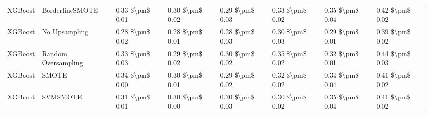 \begin{tabular}{llllllll}
                        XGBoost &               BorderlineSMOTE & 0.33 \$\textbackslash pm\$ 0.01 &           0.30 \$\textbackslash pm\$ 0.02 &       0.29 \$\textbackslash pm\$ 0.03 &        0.33 \$\textbackslash pm\$ 0.02 &                         0.35 \$\textbackslash pm\$ 0.04 &     0.42 \$\textbackslash pm\$ 0.02 \\
                        XGBoost &                 No Upsampling & 0.28 \$\textbackslash pm\$ 0.02 &           0.28 \$\textbackslash pm\$ 0.01 &       0.28 \$\textbackslash pm\$ 0.03 &        0.30 \$\textbackslash pm\$ 0.03 &                         0.29 \$\textbackslash pm\$ 0.01 &     0.39 \$\textbackslash pm\$ 0.02 \\
                        XGBoost &           Random Oversampling & 0.33 \$\textbackslash pm\$ 0.03 &           0.29 \$\textbackslash pm\$ 0.02 &       0.30 \$\textbackslash pm\$ 0.02 &        0.35 \$\textbackslash pm\$ 0.02 &                         0.32 \$\textbackslash pm\$ 0.01 &     0.44 \$\textbackslash pm\$ 0.03 \\
                        XGBoost &                         SMOTE & 0.34 \$\textbackslash pm\$ 0.00 &           0.30 \$\textbackslash pm\$ 0.01 &       0.29 \$\textbackslash pm\$ 0.02 &        0.32 \$\textbackslash pm\$ 0.02 &                         0.34 \$\textbackslash pm\$ 0.04 &     0.41 \$\textbackslash pm\$ 0.02 \\
                        XGBoost &                      SVMSMOTE & 0.31 \$\textbackslash pm\$ 0.01 &           0.30 \$\textbackslash pm\$ 0.00 &       0.30 \$\textbackslash pm\$ 0.03 &        0.30 \$\textbackslash pm\$ 0.02 &                         0.35 \$\textbackslash pm\$ 0.04 &     0.41 \$\textbackslash pm\$ 0.02 \\
\bottomrule
\end{tabular}
